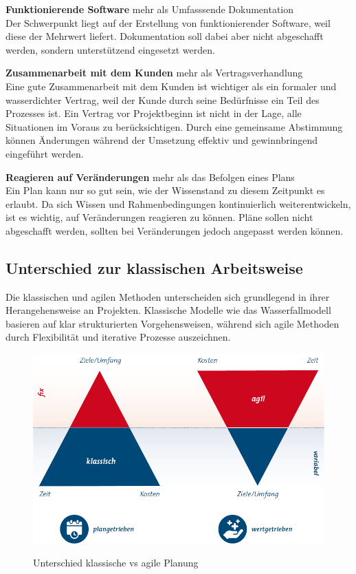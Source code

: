 \documentclass[ngerman]{seminarvorlage}
\begin{document}
\textbf{Funktionierende Software} mehr als Umfasssende Dokumentation\\
Der Schwerpunkt liegt auf der Erstellung von funktionierender Software, weil diese der Mehrwert liefert. Dokumentation soll dabei aber nicht abgeschafft werden, sondern unterstützend eingesetzt werden.

\textbf{Zusammenarbeit mit dem Kunden} mehr als Vertragsverhandlung\\
Eine gute Zusammenarbeit mit dem Kunden ist wichtiger als ein formaler und wasserdichter Vertrag, weil der Kunde durch seine Bedürfnisse ein Teil des Prozesses ist. Ein Vertrag vor Projektbeginn ist nicht in der Lage, alle Situationen im Voraus zu berücksichtigen. Durch eine gemeinsame Abstimmung können Änderungen während der Umsetzung effektiv und gewinnbringend eingeführt werden.

\textbf{Reagieren auf Veränderungen} mehr als das Befolgen eines Plans\\
Ein Plan kann nur so gut sein, wie der Wissenstand zu diesem Zeitpunkt es erlaubt. Da sich Wissen und Rahmenbedingungen kontinuierlich weiterentwickeln, ist es wichtig, auf Veränderungen reagieren zu können. Pläne sollen nicht abgeschafft werden, sollten bei Veränderungen jedoch angepasst werden können.\\

\subsection{Unterschied zur klassischen Arbeitsweise}
Die klassischen und agilen Methoden unterscheiden sich grundlegend in ihrer Herangehensweise an Projekten. Klassische Modelle wie das Wasserfallmodell basieren auf klar strukturierten Vorgehensweisen, während sich agile Methoden durch Flexibilität und iterative Prozesse auszeichnen.\cite{Ant.}\\

\begin{figure}[h]
\centering
\includegraphics[scale=.5]{"images/klassisch_agil.png"}
\caption{Unterschied klassische vs agile Planung}
\label{agil}
\cite{Consileon.2021}
\end{figure}
\end{document}
